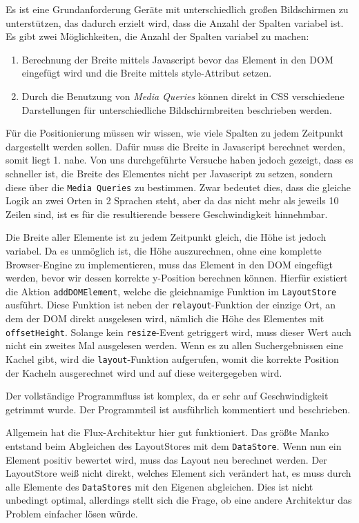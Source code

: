 \documentclass[12pt,twoside]{book}
\begin{document}
Es ist eine Grundanforderung Geräte mit unterschiedlich großen Bildschirmen zu unterstützen, das dadurch erzielt wird, dass die Anzahl der Spalten variabel ist.
Es gibt zwei Möglichkeiten, die Anzahl der Spalten variabel zu machen:

\begin{enumerate}
  \item Berechnung der Breite mittels Javascript bevor das Element in den DOM eingefügt wird und die Breite mittels style-Attribut setzen.
  \item Durch die Benutzung von \textit{Media Queries} können direkt in CSS verschiedene Darstellungen für unterschiedliche Bildschirmbreiten beschrieben werden.
\end{enumerate}

Für die Positionierung müssen wir wissen, wie viele Spalten zu jedem Zeitpunkt dargestellt werden sollen. Dafür muss die Breite in Javascript berechnet werden, somit liegt 1. nahe. Von uns durchgeführte Versuche haben jedoch gezeigt, dass es schneller ist, die Breite des Elementes nicht per Javascript zu setzen, sondern diese über die \texttt{Media Queries} zu bestimmen. Zwar bedeutet dies, dass die gleiche Logik an zwei Orten in 2 Sprachen steht, aber da das nicht mehr als jeweils 10 Zeilen sind, ist es für die resultierende bessere Geschwindigkeit hinnehmbar.

Die Breite aller Elemente ist zu jedem Zeitpunkt gleich, die Höhe ist jedoch variabel. Da es unmöglich ist, die Höhe auszurechnen, ohne eine komplette Browser-Engine zu implementieren, muss das Element in den DOM eingefügt werden, bevor wir dessen korrekte y-Position berechnen können. Hierfür existiert die Aktion \texttt{addDOMElement}, welche die gleichnamige Funktion im \texttt{LayoutStore} ausführt. Diese Funktion ist neben der \texttt{relayout}-Funktion der einzige Ort, an dem der DOM direkt ausgelesen wird, nämlich die Höhe des Elementes mit \texttt{offsetHeight}. Solange kein \texttt{resize}-Event getriggert wird, muss dieser Wert auch nicht ein zweites Mal ausgelesen werden.
Wenn es zu allen Suchergebnissen eine Kachel gibt, wird die \texttt{layout}-Funktion aufgerufen, womit die korrekte Position der Kacheln ausgerechnet wird und auf diese weitergegeben wird.

Der vollständige Programmfluss ist komplex, da er sehr auf Geschwindigkeit getrimmt wurde. Der Programmteil ist ausführlich kommentiert und beschrieben.

Allgemein hat die Flux-Architektur hier gut funktioniert. Das größte Manko entstand beim Abgleichen des LayoutStores mit dem \texttt{DataStore}. Wenn nun ein Element positiv bewertet wird, muss das Layout neu berechnet werden. Der LayoutStore weiß nicht direkt, welches Element sich verändert hat, es muss durch alle Elemente des \texttt{DataStores} mit den Eigenen abgleichen. Dies ist nicht unbedingt optimal, allerdings stellt sich die Frage, ob eine andere Architektur das Problem einfacher lösen würde.
\end{document}
